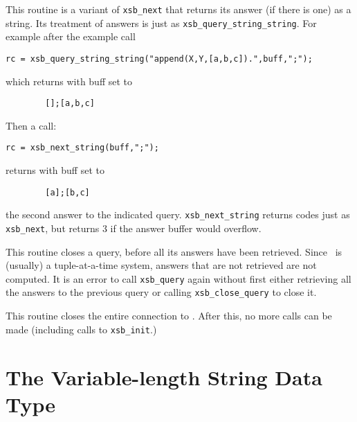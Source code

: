 \begin{description}
   This routine is a variant of {\tt xsb\_next} that
returns its answer (if there is one) as a string.  Its treatment of
answers is just as {\tt xsb\_query\_string\_string}.  For example after
the example call 
\begin{verbatim}
rc = xsb_query_string_string("append(X,Y,[a,b,c]).",buff,";");
\end{verbatim}
which returns with buff set to 
\begin{verbatim}
        [];[a,b,c]
\end{verbatim}
Then a call:
\begin{verbatim}
rc = xsb_next_string(buff,";");
\end{verbatim}
returns with buff set to 
\begin{verbatim}
        [a];[b,c]
\end{verbatim}
the second answer to the indicated query. {\tt xsb\_next\_string}
returns codes just as {\tt xsb\_next}, but returns 3 if the answer
buffer would overflow.

 
This routine closes a query, before all its answers have been
retrieved.  Since \ourprolog\ is (usually) a tuple-at-a-time system,
answers that are not retrieved are not computed.
It is an error to call {\tt xsb\_query} again without
first either retrieving all the answers to the previous query or
calling {\tt xsb\_close\_query} to close it.

 
This routine closes the entire connection to \ourprolog .  After this,
no more calls can be made (including calls to {\tt xsb\_init}.)
\end{description}

\section{The Variable-length String Data Type}\label{sec-varstring}

